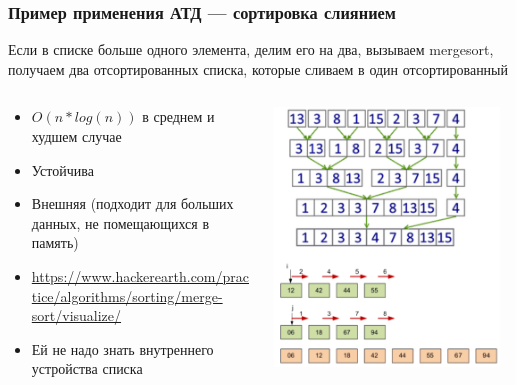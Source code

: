 \documentclass[xetex,mathserif,serif]{beamer}
\begin{document}
    \begin{frame}
        \frametitle{Пример применения АТД --- сортировка слиянием}
        Если в списке больше одного элемента, делим его на два, вызываем mergesort, получаем два отсортированных списка, которые сливаем в один отсортированный
        \begin{columns}
            \begin{column}{0.6\textwidth}
                \begin{itemize}
                    \item $O(n * log(n))$ в среднем и худшем случае
                    \item Устойчива
                    \item Внешняя (подходит для больших данных, не помещающихся в память)
                    \item \url{https://www.hackerearth.com/practice/algorithms/sorting/merge-sort/visualize/}
                    \item Ей не надо знать внутреннего устройства списка
                \end{itemize}
            \end{column}
            \begin{column}{0.4\textwidth}
                \begin{center}
                    \includegraphics[width=0.95\textwidth]{mergesort.png}
                \end{center}
            \end{column}
        \end{columns}
    \end{frame}
\end{document}

